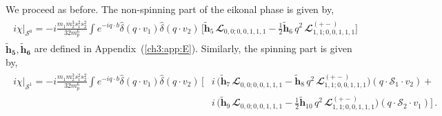 We proceed as before. The non-spinning part of the eikonal phase is given by, %
\begin{align}
    \begin{split} \label{eq3}
      i\chi\Big|_{\mathcal{S}^0}=-i\frac{m_1m_2^3 s_1^2 s_2^2}{32 m_p^6}\int e^{-iq\cdot b}\hat\delta(q\cdot v_1)\hat\delta(q\cdot v_2)\,\Bigg[ \boldsymbol{\tilde h}_5 \,\mathbfcal{L}_{0,0;0,0,1,1,1}-\frac{1}{2}\boldsymbol{\tilde h}_6 \,q^2\,\mathbfcal{L}^{(+-)}_{1,1;0,0,1,1,1}\Bigg]
    \end{split}
\end{align}
$ \boldsymbol{\tilde h_5},  \boldsymbol{\tilde h_6}$ are defined in Appendix~(\ref{ch3:app:E}).
Similarly, the spinning part is given by, 
\begin{align}
    \begin{split}  \label{eq4}
      i\chi\Big|_{\mathcal{S}^1}=-i\frac{m_1m_2^3 s_1^2 s_2^2}{32 m_p^6}\int e^{-iq\cdot b}\hat\delta(q\cdot v_1)\hat\delta(q\cdot v_2)\,\Bigg[ &i\,\Bigg(\boldsymbol{\tilde h}_7 \,\mathbfcal{L}_{0,0;0,0,1,1,1}-\boldsymbol{\tilde h}_8 \,q^2\,\mathbfcal{L}^{(+-)}_{1,1;0,0,1,1,1}\Bigg)(q\cdot \mathcal{S}_1\cdot v_2)+\\&i\,\Bigg(\boldsymbol{\tilde h}_9\,\mathbfcal{L}_{0,0;0,0,1,1,1}-\frac{1}{2}\boldsymbol{\tilde h}_{10}\,q^2\,\mathbfcal{L}^{(+-)}_{1,1;0,0,1,1,1}\Bigg)(q\cdot \mathcal{S}_2\cdot v_1)\Bigg]\,.
    \end{split}
\end{align}

